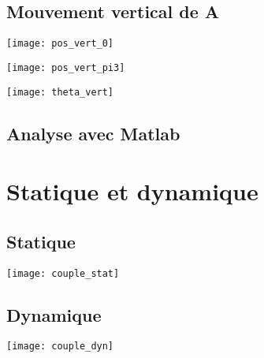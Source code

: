 \documentclass{udes_rapport} %
\begin{document}
\subsection{Mouvement vertical de A}

\noindent\begin{minipage}{\textwidth} 
\begin{minipage}{0.5\textwidth}
  \centering
  \texttt{[image: pos\_vert\_0]}
  \label{pos_vert:position_verticale_initiale}
\end{minipage}%
\begin{minipage}{0.5\textwidth}
  \centering 
  \texttt{[image: pos\_vert\_pi3]} 
  \label{pos_vert:position_verticale_finale} 
\end{minipage} 
\label{pos_vert} 
\end{minipage}

\begin{center}
	\centering
	\texttt{[image: theta\_vert]}
	\label{composantes_verticale_theta}
\end{center}
\subsection{Analyse avec Matlab}



\section{Statique et dynamique}
\subsection{Statique}
\begin{center}
	\centering
	\texttt{[image: couple\_stat]}
	\label{couple_statique}
\end{center}
\subsection{Dynamique}
\begin{center}
	\centering
	\texttt{[image: couple\_dyn]}
	\label{couple_dynamique}
\end{center}
\end{document}
